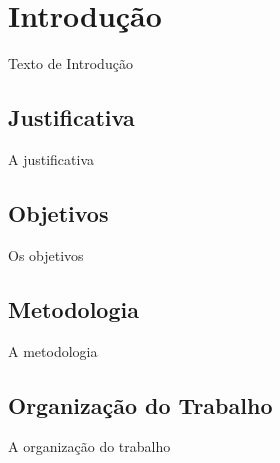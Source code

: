\chapter{Introdução} \label{cap:introducao}

Texto de Introdução

\section{Justificativa}

A justificativa

\section{Objetivos} \label{sec:objetivos}

Os objetivos

\section{Metodologia}

A metodologia

\section{Organização do Trabalho}

A organização do trabalho